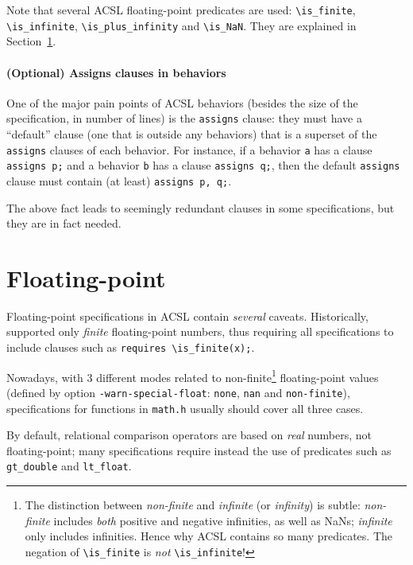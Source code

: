 \documentclass{frama-c-book}
\begin{document}
Note that several ACSL floating-point predicates are used: \verb+\is_finite+,
\verb+\is_infinite+, \verb+\is_plus_infinity+ and \verb+\is_NaN+. They are
explained in Section~\ref{sec:acsl-guide-float}.

\paragraph{(Optional) Assigns clauses in behaviors}

One of the major pain points of ACSL behaviors (besides the size of the
specification, in number of lines) is the \texttt{assigns} clause:
they must have a ``default'' clause (one that is outside any behaviors)
that is a superset of the \texttt{assigns} clauses of each behavior.
For instance, if a behavior \texttt{a} has a clause \verb+assigns p;+
and a behavior \texttt{b} has a clause \verb+assigns q;+, then the
default \texttt{assigns} clause must contain (at least)
\verb+assigns p, q;+.

The above fact leads to seemingly redundant clauses in some specifications,
but they are in fact needed.

\section{Floating-point}
\label{sec:acsl-guide-float}

Floating-point specifications in ACSL contain {\em several} caveats.
Historically, \Eva{} supported only {\em finite} floating-point numbers,
thus requiring all specifications to include clauses such as
\verb+requires \is_finite(x);+.

Nowadays, with 3 different modes related to non-finite\footnote{%
The distinction between {\em non-finite} and {\em infinite}
(or {\em infinity}) is subtle: {\em non-finite} includes {\em both}
positive and negative infinities, as well as NaNs; {\em infinite} only
includes infinities. Hence why ACSL contains so many predicates.
The negation of \texttt{\textbackslash{}is\_finite} is {\em not}
\texttt{\textbackslash{}is\_infinite}!}
floating-point values (defined by option \texttt{-warn-special-float}:
\texttt{none}, \texttt{nan} and \texttt{non-finite}), specifications for
functions in \texttt{math.h} usually should cover all three cases.

By default, relational comparison operators are based on {\em real} numbers,
not floating-point; many specifications require instead the use of
predicates such as \verb+gt_double+ and \verb+lt_float+.
\end{document}
